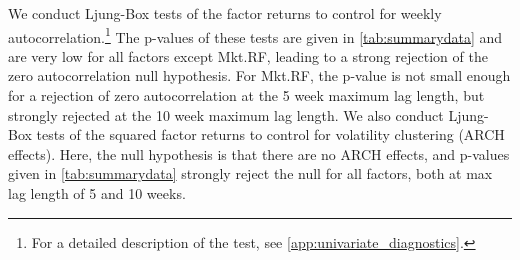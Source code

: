 We conduct Ljung-Box tests of the factor returns to control for weekly autocorrelation.\footnote{For a detailed description of the test, see \autoref{app:univariate_diagnostics}.} The p-values of these tests are given in \autoref{tab:summarydata} and are very low for all factors except Mkt.RF, leading to a strong rejection of the zero autocorrelation null hypothesis. For Mkt.RF, the p-value is not small enough for a rejection of zero autocorrelation at the 5 week maximum lag length, but strongly rejected at the 10 week maximum lag length. We also conduct Ljung-Box tests of the squared factor returns to control for volatility clustering (ARCH effects). Here, the null hypothesis is that there are no ARCH effects, and p-values given in \autoref{tab:summarydata} strongly reject the null for all factors, both at max lag length of 5 and 10 weeks.

